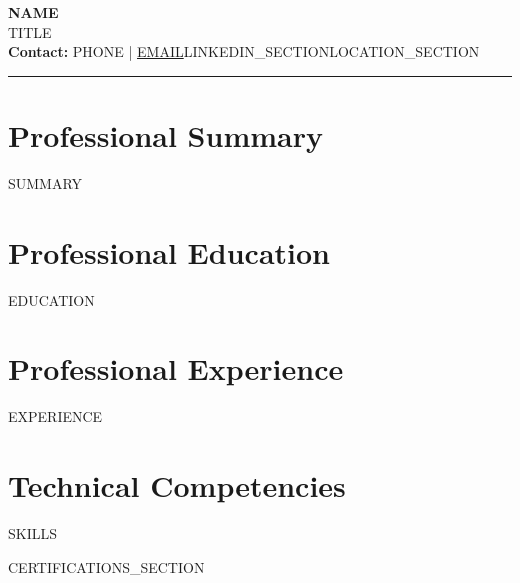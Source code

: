 \documentclass[11pt,a4paper]{article}
\begin{document}
\begin{center}
    {\Huge\bfseries\color{headercolor} {{NAME}}} \\[0.2em]
    {\Large {{TITLE}}} \\[1em]
    {\normalsize
        \textbf{Contact:} {{PHONE}} \quad | \quad
        \href{mailto:{{EMAIL}}}{{{EMAIL}}}{{LINKEDIN_SECTION}}{{LOCATION_SECTION}}
    }
\end{center}

\vspace{0.5em}
\rule{\textwidth}{0.4pt}

\section{Professional Summary}
{{SUMMARY}}

\section{Professional Education}
{{EDUCATION}}

\section{Professional Experience}
{{EXPERIENCE}}

\section{Technical Competencies}
{{SKILLS}}

{{CERTIFICATIONS_SECTION}}
\end{document}
